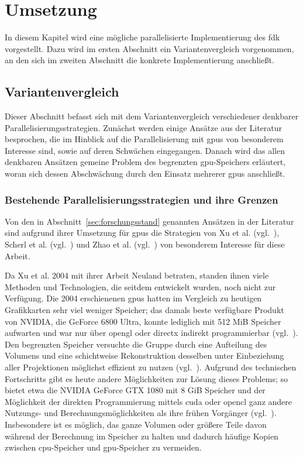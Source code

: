 \chapter{Umsetzung}\label{chap:umsetzung}

In diesem Kapitel wird eine mögliche parallelisierte Implementierung des \gls{fdk} vorgestellt. Dazu wird im ersten
Abschnitt ein Variantenvergleich vorgenommen, an den sich im zweiten Abschnitt die konkrete Implementierung anschließt.

\section{Variantenvergleich}

Dieser Abschnitt befasst sich mit dem Variantenvergleich verschiedener denkbarer Parallelisierungsstrategien. Zunächst
werden einige Ansätze aus der Literatur besprochen, die im Hinblick auf die Parallelisierung mit \gls{gpu}s von
besonderem Interesse sind, sowie auf deren Schwächen eingegangen. Danach wird das allen denkbaren Ansätzen
gemeine Problem des begrenzten \gls{gpu}-Speichers erläutert, woran sich dessen Abschwächung durch den Einsatz mehrerer
\gls{gpu}s anschließt.

\subsection{Bestehende Parallelisierungsstrategien und ihre Grenzen}\label{ssec:par_strat}

Von den in Abschnitt~\ref{sec:forschungsstand} genannten Ansätzen in der Literatur sind aufgrund ihrer Umsetzung für
\gls{gpu}s die Strategien von Xu et al. (vgl.~\cite{xumuell}), Scherl et al. (vgl.~\cite{scherlkeck}) und Zhao et al.
(vgl.~\cite{zhao}) von besonderem Interesse für diese Arbeit.

Da Xu et al. 2004 mit ihrer Arbeit Neuland betraten, standen ihnen viele Methoden und Technologien, die seitdem 
entwickelt wurden, noch nicht zur Verfügung. Die 2004 erschienenen \gls{gpu}s hatten im Vergleich zu heutigen
Grafikkarten sehr viel weniger Speicher; das damals beste verfügbare Produkt von NVIDIA, die GeForce 6800 Ultra, konnte
lediglich mit 512 MiB Speicher aufwarten und war nur über \gls{opengl} oder \gls{directx} indirekt programmierbar
(vgl.~\cite{geforce6800}). Den begrenzten Speicher versuchte die Gruppe durch eine Aufteilung des Volumens und eine
schichtweise Rekonstruktion desselben unter Einbeziehung aller Projektionen möglichst effizient zu nutzen
(vgl.~\cite{xumuell}). Aufgrund des technischen Fortschritts gibt es heute andere Möglichkeiten zur Lösung dieses
Problems; so bietet etwa die NVIDIA GeForce GTX 1080 mit 8 GiB Speicher und der Möglichkeit der direkten Programmierung
mittels \gls{cuda} oder \gls{opencl} ganz andere Nutzungs- und Berechnungsmöglichkeiten als ihre frühen Vorgänger
(vgl.~\cite{gtx1080}). Insbesondere ist es möglich, das ganze Volumen oder größere Teile davon während der Berechnung im
Speicher zu halten und dadurch häufige Kopien zwischen \gls{cpu}-Speicher und \gls{gpu}-Speicher zu vermeiden.

